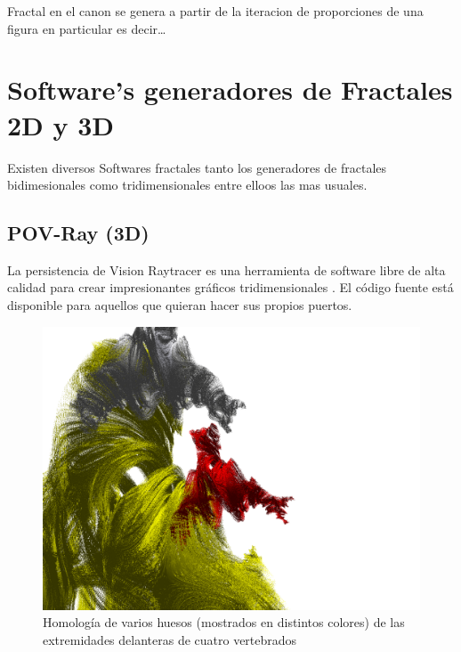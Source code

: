 \documentclass[
  11pt,
]{krantz}
\theoremstyle{definition}
\theoremstyle{definition}
\theoremstyle{definition}
\theoremstyle{definition}
\theoremstyle{remark}
\begin{document}
Fractal en el canon se genera a partir de la iteracion de proporciones de una figura en particular es decir\ldots{}

\hypertarget{softwares-generadores-de-fractales-2d-y-3d}{%
\section{Software's generadores de Fractales 2D y 3D}\label{softwares-generadores-de-fractales-2d-y-3d}}

Existen diversos Softwares fractales tanto los generadores de fractales bidimesionales como tridimensionales entre elloos las mas usuales.

\hypertarget{pov-ray-3d}{%
\subsection{POV-Ray (3D)}\label{pov-ray-3d}}

La persistencia de Vision Raytracer es una herramienta de software libre de alta calidad para crear impresionantes gráficos tridimensionales . El código fuente está disponible para aquellos que quieran hacer sus propios puertos.

\begin{figure}[!ht]

{\centering \includegraphics[width=1\linewidth]{povray} 

}

\caption{Homología de varios huesos (mostrados en distintos colores) de las extremidades delanteras de cuatro vertebrados}\label{fig:ray}
\end{figure}
\end{document}

